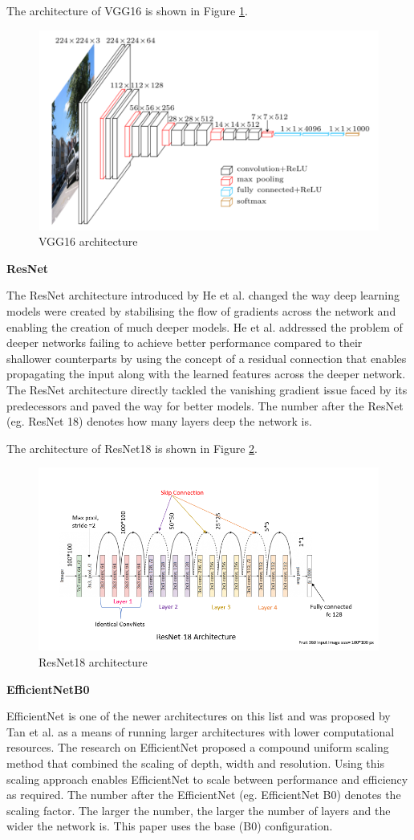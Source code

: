 \documentclass[a4paper,11pt,openright]{book}
\begin{document}
The architecture of VGG16 is shown in Figure \ref{fig:vgg16}.

\begin{figure}[!htb]
    \centering
    \includegraphics[width=.6\linewidth]{images/vggarch.png}
    \caption{VGG16 architecture}
    \label{fig:vgg16}
\end{figure}

\textbf{ResNet}

The ResNet architecture \cite{heDeepResidualLearning2016} introduced by He et al. changed the way deep learning models were created by stabilising the flow of gradients across the network and enabling the creation of much deeper models. He et al. addressed the problem of deeper networks failing to achieve better performance compared to their shallower counterparts by using the concept of a residual connection that enables propagating the input along with the learned features across the deeper network. The ResNet architecture directly tackled the vanishing gradient issue faced by its predecessors and paved the way for better models. The number after the ResNet (eg. ResNet 18) denotes how many layers deep the network is.

The architecture of ResNet18 is shown in Figure \ref{fig:resnet18}.
\begin{figure}[!htb]
    \centering
    \includegraphics[width=.6\linewidth]{images/resnetarch.png}
    \caption{ResNet18 architecture}
    \label{fig:resnet18}
\end{figure}

\textbf{EfficientNetB0}

EfficientNet is one of the newer architectures on this list and was proposed by Tan et al. as a means of running larger architectures with lower computational resources. The research on EfficientNet proposed a compound uniform scaling method that combined the scaling of depth, width and resolution. Using this scaling approach enables EfficientNet to scale between performance and efficiency as required. The number after the EfficientNet (eg. EfficientNet B0) denotes the scaling factor. The larger the number, the larger the number of layers and the wider the network is. This paper uses the base (B0) configuration.
\end{document}
